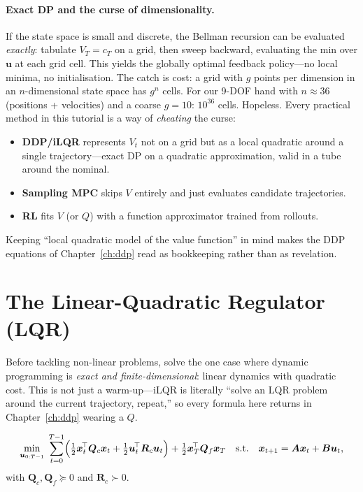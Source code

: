 \documentclass[11pt,twoside]{report}
\theoremstyle{definition}
\theoremstyle{plain}
\theoremstyle{remark}
\newcommand{\x}{\bm{x}}
\newcommand{\uu}{\bm{u}}
\newcommand{\0}{\bm{0}}
\begin{document}
\paragraph{Exact DP and the curse of dimensionality.}
If the state space is small and discrete, the Bellman recursion can be
evaluated \emph{exactly}: tabulate $V_{T}=c_{T}$ on a grid, then sweep
backward, evaluating the min over $\uu$ at each grid cell. This yields
the globally optimal feedback policy---no local minima, no
initialisation. The catch is cost: a grid with $g$ points per dimension
in an $n$-dimensional state space has $g^{n}$ cells. For our 9-DOF hand
with $n\approx 36$ (positions + velocities) and a coarse $g=10$:
$10^{36}$ cells. Hopeless. Every practical method in this tutorial is a
way of \emph{cheating} the curse:
\begin{itemize}
\item \textbf{DDP/iLQR} represents $V_{t}$ not on a grid but as a local
      quadratic around a single trajectory---exact DP on a quadratic
      approximation, valid in a tube around the nominal.
\item \textbf{Sampling MPC} skips $V$ entirely and just evaluates
      candidate trajectories.
\item \textbf{RL} fits $V$ (or $Q$) with a function approximator
      trained from rollouts.
\end{itemize}
Keeping ``local quadratic model of the value function'' in mind makes
the DDP equations of Chapter~\ref{ch:ddp} read as bookkeeping rather
than as revelation.

\section{The Linear-Quadratic Regulator (LQR)}
\label{sec:lqr}

Before tackling non-linear problems, solve the one case where dynamic
programming is \emph{exact and finite-dimensional}: linear dynamics with
quadratic cost. This is not just a warm-up---iLQR is literally
``solve an LQR problem around the current trajectory, repeat,'' so
every formula here returns in Chapter~\ref{ch:ddp} wearing a $Q$.

\begin{definitionbox}
\begin{equation}
\min_{\uu_{0:T-1}}\;
\sum_{t=0}^{T-1}\Bigl(\tfrac12\x_{t}^{\!\top}\bm{Q}_{c}\x_{t}
+\tfrac12\uu_{t}^{\!\top}\bm{R}_{c}\uu_{t}\Bigr)
+\tfrac12\x_{T}^{\!\top}\bm{Q}_{f}\x_{T}
\quad\text{s.t.}\quad
\x_{t+1}=\bm{A}\x_{t}+\bm{B}\uu_{t},
\end{equation}
with $\bm{Q}_{c},\bm{Q}_{f}\succeq 0$ and $\bm{R}_{c}\succ 0$.
\end{definitionbox}
\end{document}
